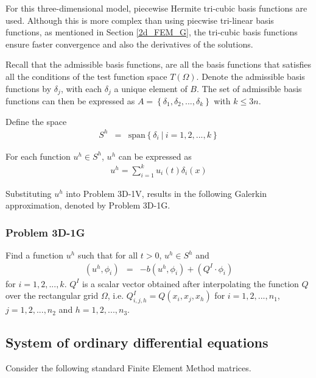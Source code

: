 \documentclass[../../main.tex]{subfiles}
\begin{document}
For this three-dimensional model, piecewise Hermite tri-cubic basis functions are used. Although this is more complex than using piecwise tri-linear basis functions, as mentioned in Section \ref{2d_FEM_G}, the tri-cubic basis functions ensure faster convergence and also the derivatives of the solutions.

Recall that the admissible basis functions, are all the basis functions that satisfies all the conditions of the test function space $T(\Omega)$. Denote the admissible basis functions by $\delta_j$, with each $\delta_j$ a unique element of $B$. The set of admissible basis functions can then be expressed as $A = \left\{\delta_1, \delta_2,... , \delta_k\right\}$ with $k \leq 3n$.

Define the space
\begin{eqnarray*}
	S^h & = & \textrm{span}\left\{\delta_i \ | \ i = 1,2,...,k \right\}
\end{eqnarray*}

For each function $u^h \in S^h$, $u^h$ can be expressed as
\begin{eqnarray*}
	u^h = \sum_{i = 1}^{k} u_i(t) \delta_{i}(x)
\end{eqnarray*}

Substituting $u^h$ into Problem 3D-1V, results in the following Galerkin approximation, denoted by Problem 3D-1G.

\subsubsection{Problem 3D-1G}
Find a function $u^h$ such that for all $t>0$, $u^h \in S^h$ and
\begin{eqnarray*}
	(u^h, \phi_i) & = & -b(u^h,\phi_i) + (Q^I \cdot \phi_i)
\end{eqnarray*} for $i = 1,2,...,k$. $Q^I$ is a scalar vector obtained after interpolating the function $Q$ over the rectangular grid $\Omega$, i.e. $Q^I_{i,j, h} = Q(x_i,x_j, x_h)$ for $i = 1,2,...,n_1$, $j = 1,2,...,n_2$ and $h = 1,2,...,n_3$.

\subsection{System of ordinary differential equations}\label{3d_fem_g}
Consider the following standard Finite Element Method matrices.
\end{document}
